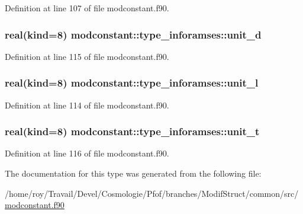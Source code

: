 Definition at line 107 of file modconstant.\-f90.

\hypertarget{structmodconstant_1_1type__inforamses_a9bec2e4699094994b6802b7a63223c20}{
\subsubsection[{unit\-\_\-d}]{\setlength{\rightskip}{0pt plus 5cm}real(kind=8) modconstant\-::type\-\_\-inforamses\-::unit\-\_\-d}}\label{structmodconstant_1_1type__inforamses_a9bec2e4699094994b6802b7a63223c20}


Definition at line 115 of file modconstant.\-f90.

\hypertarget{structmodconstant_1_1type__inforamses_a6f87e3e1bebd53aa16cbc67b1a47ad80}{
\subsubsection[{unit\-\_\-l}]{\setlength{\rightskip}{0pt plus 5cm}real(kind=8) modconstant\-::type\-\_\-inforamses\-::unit\-\_\-l}}\label{structmodconstant_1_1type__inforamses_a6f87e3e1bebd53aa16cbc67b1a47ad80}


Definition at line 114 of file modconstant.\-f90.

\hypertarget{structmodconstant_1_1type__inforamses_a476201b699ccd42e319364d8975a9293}{
\subsubsection[{unit\-\_\-t}]{\setlength{\rightskip}{0pt plus 5cm}real(kind=8) modconstant\-::type\-\_\-inforamses\-::unit\-\_\-t}}\label{structmodconstant_1_1type__inforamses_a476201b699ccd42e319364d8975a9293}


Definition at line 116 of file modconstant.\-f90.



The documentation for this type was generated from the following file\-:\begin{DoxyCompactItemize}
\item 
/home/roy/\-Travail/\-Devel/\-Cosmologie/\-Pfof/branches/\-Modif\-Struct/common/src/\hyperlink{modconstant_8f90}{modconstant.\-f90}\end{DoxyCompactItemize}
